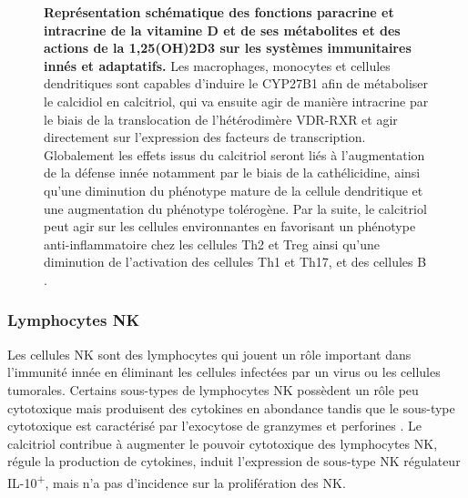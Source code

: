 \documentclass[
  a4paper,
  DIV=11,
  numbers=noendperiod,
  listof=totoc]{scrreprt}
\begin{document}
\begin{figure}


\caption[Représentation schématique des fonctions paracrine et
intracrine de la vitamine D et de ses métabolites et des actions de la
\ac{1,25(OH)2D3} sur les systèmes immunitaires innés et
adaptatifs.]{\label{fig-vd-action}\textbf{Représentation schématique des
fonctions paracrine et intracrine de la vitamine D et de ses métabolites
et des actions de la \ac{1,25(OH)2D3} sur les systèmes immunitaires
innés et adaptatifs.} Les macrophages, monocytes et cellules
dendritiques sont capables d'induire le \ac{CYP27B1} afin de métaboliser
le calcidiol en calcitriol, qui va ensuite agir de manière intracrine
par le biais de la translocation de l'hétérodimère \ac{VDR}-\ac{RXR} et
agir directement sur l'expression des facteurs de transcription.
Globalement les effets issus du calcitriol seront liés à l'augmentation
de la défense innée notamment par le biais de la cathélicidine, ainsi
qu'une diminution du phénotype mature de la cellule dendritique et une
augmentation du phénotype tolérogène. Par la suite, le calcitriol peut
agir sur les cellules environnantes en favorisant un phénotype
anti-inflammatoire chez les cellules \ac{Th2} et \ac{Treg} ainsi qu'une
diminution de l'activation des cellules \ac{Th1} et \ac{Th17}, et des
cellules B \autocite{Charoenngam.2020}.}

\end{figure}%

\subsubsection{Lymphocytes NK}\label{lymphocytes-nk}

Les cellules \ac{NK} sont des lymphocytes qui jouent un rôle important
dans l'immunité innée en éliminant les cellules infectées par un virus
ou les cellules tumorales. Certains sous-types de lymphocytes NK
possèdent un rôle peu cytotoxique mais produisent des cytokines en
abondance tandis que le sous-type cytotoxique est caractérisé par
l'exocytose de granzymes et perforines \autocite{Moretta.2008}. Le
calcitriol contribue à augmenter le pouvoir cytotoxique des lymphocytes
\ac{NK}, régule la production de cytokines, induit l'expression de
sous-type NK régulateur IL-10\textsuperscript{+}, mais n'a pas
d'incidence sur la prolifération des \ac{NK}.
\end{document}
